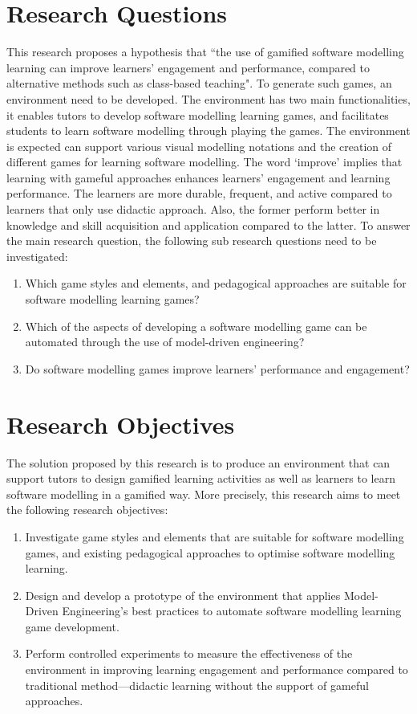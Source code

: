 \documentclass[10pt, a4paper]{report} \usepackage[titletoc]{appendix}
\begin{document}
\section{Research Questions}
This research proposes a hypothesis that ``the use of gamified software modelling learning can improve learners' engagement and performance, compared to alternative methods such as class-based teaching". To generate such games, an environment need to be developed. The environment has two main functionalities, it enables tutors to develop software modelling learning games, and facilitates students to learn software modelling through playing the games. The environment is expected can support various visual modelling notations and the creation of different games for learning software modelling. The word `improve' implies that learning with gameful approaches enhances learners' engagement and learning performance. The learners are more durable, frequent, and active compared to learners that only use didactic approach. Also, the former perform better in knowledge and skill acquisition and application compared to the latter. To answer the main research question, the following sub research questions need to be investigated:
\begin{enumerate} 
\item Which game styles and elements, and pedagogical approaches are suitable for software modelling learning games?
\item Which of the aspects of developing a software modelling game can be automated through the use of model-driven engineering?
\item Do software modelling games improve learners' performance and engagement?
\end{enumerate}

\section{Research Objectives}
The solution proposed by this research is to produce an environment that can support tutors to design gamified learning activities as well as learners to learn software modelling in a gamified way. More precisely, this research aims to meet the following research objectives:
\begin{enumerate}
\item Investigate game styles and elements that are suitable for software modelling games, and existing pedagogical approaches to optimise software modelling learning.
\item Design and develop a prototype of the environment that applies Model-Driven Engineering's best practices to automate software modelling learning game development. 
\item Perform controlled experiments to measure the effectiveness of the environment in improving learning engagement and performance compared to traditional method---didactic learning without the support of gameful approaches.
\end{enumerate}
\end{document}
